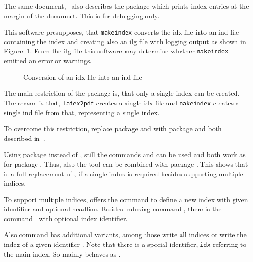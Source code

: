 The same document,~\cite{MkidxShIdxP} 
also describes the package  
which prints index entries at the margin of the document. 
This is for debugging only. 



This software presupposes, that \texttt{makeindex} converts the \gls{idx} file 
into an ind file containing the index 
and creating also an \gls{ilg} file with logging output 
as shown in Figure~\ref{fig:idx2ind}. 
From the \gls{ilg} file this software may determine 
whether \texttt{makeindex} emitted an error or warnings. 

\begin{figure}[htb]
\centering
{}
\caption{\label{fig:idx2ind}Conversion of an \gls{idx} file into an \gls{ind} file}
\end{figure}
\medskip


The main restriction of the package  is, 
that only a single index can be created. 
The reason is that, \texttt{latex2pdf} creates a single \gls{idx} file 
and \texttt{makeindex} creates a single ind file from that, 
representing a single index. 

To overcome this restriction, 
replace package  and  
with package  and  
both described in~\cite{SplitidxP}. 

Using package  instead of , 
still the commands  and  can be used 
and both work as for package . 
Thus, also the tool  can be combined with package . 
This shows that  is a full replacement of , 
if a single index is required besides supporting multiple indices. 

To support multiple indices, 
 offers the command  
to define a new index with given identifier and optional headline. 
Besides indexing command , 
there is the command , 
with optional index identifier. 

Also command  has additional variants, 
among those write all indices or write the index of a given identifier . 
Note that there is a special identifier, \texttt{idx} referring to the main index. 
So  mainly behaves as . 

